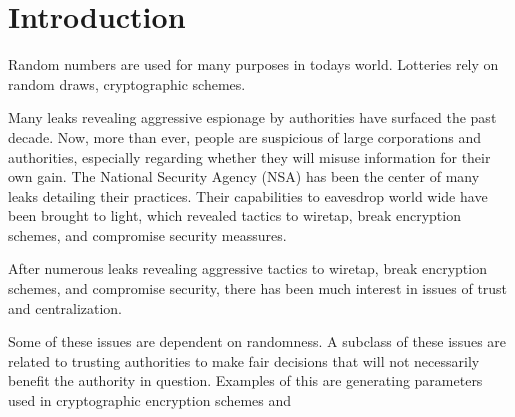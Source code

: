 \section{Introduction}\label{cha:introduction}

Random numbers are used for many purposes in todays world. Lotteries rely on random draws, cryptographic schemes.



Many leaks revealing aggressive espionage by authorities have surfaced the past decade. Now, more than ever, people are suspicious of large corporations and authorities, especially regarding whether they will misuse information for their own gain.
The National Security Agency (NSA) has been the center of many leaks detailing their practices. Their capabilities to eavesdrop world wide have been brought to light, which revealed tactics to wiretap, break encryption schemes, and compromise security meassures.

After numerous leaks revealing aggressive tactics to wiretap, break encryption schemes, and compromise security, there has been much interest in issues of trust and centralization.



Some of these issues are dependent on randomness. 
A subclass of these issues are related to trusting authorities to make fair decisions that will not necessarily benefit the authority in question. Examples of this are generating parameters used in cryptographic encryption schemes and 




